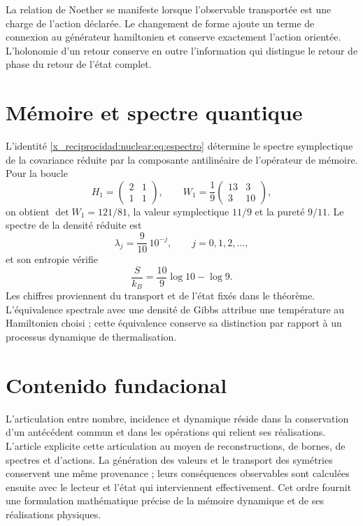 La relation de Noether se manifeste lorsque l’observable transportée est une charge de l’action déclarée. Le changement de forme ajoute un terme de connexion au générateur hamiltonien et conserve exactement l’action orientée. L’holonomie d’un retour conserve en outre l’information qui distingue le retour de phase du retour de l’état complet.

\section{Mémoire et spectre quantique}
L’identité \eqref{x_reciprocidad:nuclear:eq:espectro} détermine le spectre symplectique de la covariance réduite par la composante antilinéaire de l’opérateur de mémoire. Pour la boucle
\[
H_1=\begin{pmatrix}2&1\\1&1\end{pmatrix},
\qquad
W_1=\frac19\begin{pmatrix}13&3\\3&10\end{pmatrix},
\]
on obtient \(\det W_1=121/81\), la valeur symplectique \(11/9\) et la pureté \(9/11\). Le spectre de la densité réduite est
\[
\lambda_j=\frac9{10}\,10^{-j},\qquad j=0,1,2,\ldots,
\]
et son entropie vérifie
\[
\frac{S}{k_B}=\frac{10}{9}\log10-\log9.
\]
Les chiffres proviennent du transport et de l’état fixés dans le théorème. L’équivalence spectrale avec une densité de Gibbs attribue une température au Hamiltonien choisi ; cette équivalence conserve sa distinction par rapport à un processus dynamique de thermalisation.

\section{Contenido fundacional}
L’articulation entre nombre, incidence et dynamique réside dans la conservation d’un antécédent commun et dans les opérations qui relient ses réalisations. L’article explicite cette articulation au moyen de reconstructions, de bornes, de spectres et d’actions. La génération des valeurs et le transport des symétries conservent une même provenance ; leurs conséquences observables sont calculées ensuite avec le lecteur et l’état qui interviennent effectivement. Cet ordre fournit une formulation mathématique précise de la mémoire dynamique et de ses réalisations physiques.
